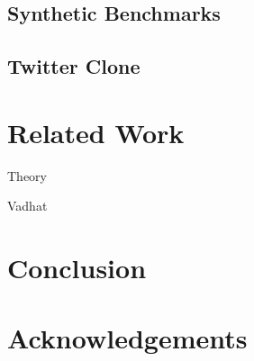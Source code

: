 \documentclass{vldb}
\begin{document}
\subsection{Synthetic Benchmarks}

\subsection{Twitter Clone}

\section{Related Work}

Theory

Vadhat

\section{Conclusion}

\section*{Acknowledgements}

\balance



\end{document}
